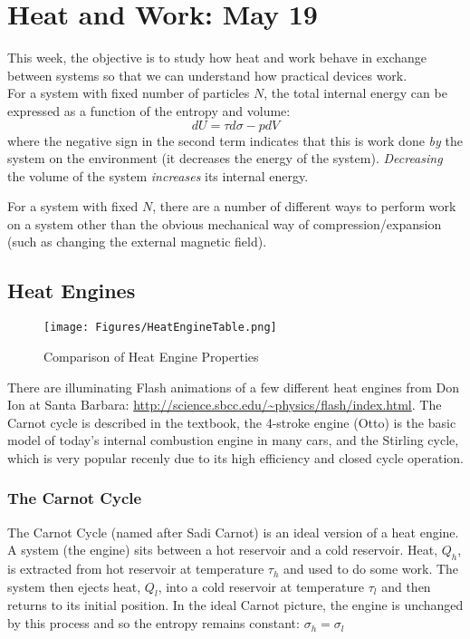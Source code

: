 \section{Heat and Work: May 19}

This week, the objective is to study how heat and work behave in exchange between systems so that we can understand how practical devices work.\\

For a system with fixed number of particles $N$, the total internal energy can be expressed as a function of the entropy and volume:
\begin{equation}
dU = \tau d\sigma - p dV
\end{equation}
where the negative sign in the second term indicates that this is work done \textit{by} the system on the environment (it decreases the energy of the system). \emph{Decreasing} the volume of the system \emph{increases} its internal energy.

For a system with fixed $N$, there are a number of different ways to perform work on a system other than the obvious mechanical way of compression/expansion (such as changing the external magnetic field).

\subsection{Heat Engines}
\begin{figure}[ht]
\centering
\texttt{[image: Figures/HeatEngineTable.png]}
\caption{Comparison of Heat Engine Properties}
\end{figure}

There are illuminating Flash animations of a few different heat engines from Don Ion at Santa Barbara:
\url{http://science.sbcc.edu/~physics/flash/index.html}. The Carnot cycle is described in the textbook,
the 4-stroke engine (Otto) is the basic model of today's internal combustion engine in many cars, and
the Stirling cycle, which is very popular recenly due to its high efficiency and closed cycle operation.

\subsubsection{The Carnot Cycle}
The Carnot Cycle (named after Sadi Carnot) is an ideal version of a heat engine. A system (the engine) sits between a hot reservoir and a cold reservoir. Heat, $Q_h$, is extracted from hot reservoir at temperature $\tau_h$ and used to do some work. The system then ejects heat, $Q_l$, into a cold reservoir at temperature $\tau_l$ and then returns to its initial position. In the ideal Carnot picture, the engine is unchanged by this process and so the entropy remains constant: $\sigma_h = \sigma_l$

